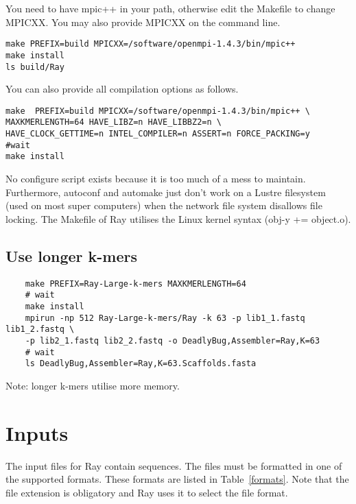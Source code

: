 \documentclass{article}
\begin{document}
You need to have mpic++ in your path, otherwise edit the Makefile to change MPICXX.
You may also provide MPICXX on the command line.

\begin{verbatim}
make PREFIX=build MPICXX=/software/openmpi-1.4.3/bin/mpic++
make install
ls build/Ray
\end{verbatim}

You can also provide all compilation options as follows.

\begin{verbatim}
make  PREFIX=build MPICXX=/software/openmpi-1.4.3/bin/mpic++ \
MAXKMERLENGTH=64 HAVE_LIBZ=n HAVE_LIBBZ2=n \
HAVE_CLOCK_GETTIME=n INTEL_COMPILER=n ASSERT=n FORCE_PACKING=y
#wait 
make install
\end{verbatim}


No configure script exists because it is too much of a mess to maintain.
Furthermore, autoconf and automake just don't work on a Lustre filesystem (used on most
super computers) when the network file system disallows file locking.
The Makefile of Ray utilises the Linux kernel syntax (obj-y += object.o).

\subsection{Use longer k-mers}

\begin{verbatim}
	make PREFIX=Ray-Large-k-mers MAXKMERLENGTH=64
	# wait
	make install
	mpirun -np 512 Ray-Large-k-mers/Ray -k 63 -p lib1_1.fastq lib1_2.fastq \
	-p lib2_1.fastq lib2_2.fastq -o DeadlyBug,Assembler=Ray,K=63
	# wait
	ls DeadlyBug,Assembler=Ray,K=63.Scaffolds.fasta
\end{verbatim}

Note: longer k-mers utilise more memory.

\section{Inputs}

The input files for Ray contain sequences. The files must be formatted in one of the supported formats.
These formats are listed in Table~\ref{formats}. Note that the file extension is obligatory and Ray uses it
to select the file format.
\end{document}
